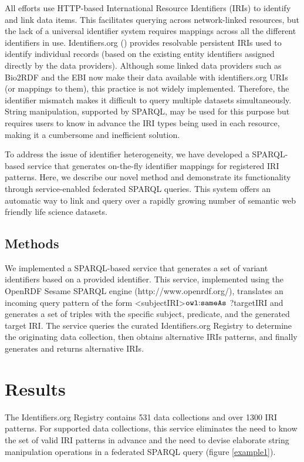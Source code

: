 \documentclass{bioinfo}
\begin{document}
All efforts use HTTP-based International Resource Identifiers (IRIs) to identify and link data items. This facilitates querying across network-linked resources, but the lack of a universal identifier system requires mappings across all the different identifiers in use. Identifiers.org (\cite{Juty01012012}) provides resolvable persistent IRIs used to identify individual records (based on the existing entity identifiers assigned directly by the data providers). Although some linked data providers such as Bio2RDF and the EBI now make their data available with identifiers.org URIs (or mappings to them), this practice is not widely implemented. Therefore, the identifier mismatch makes it difficult to query multiple datasets simultaneously. String manipulation, supported by SPARQL, may be used for this purpose but requires users to know in advance the IRI types being used in each resource, making it a cumbersome and inefficient solution.
 
To address the issue of identifier heterogeneity, we have developed a SPARQL-based service that generates on-the-fly identifier mappings for registered IRI patterns. Here, we describe our novel method and demonstrate its functionality through service-enabled federated SPARQL queries. This system offers an automatic way to link and query over a rapidly growing number of semantic web friendly life science datasets.

\begin{methods}
\section{Methods}
We implemented a SPARQL-based service that generates a set of variant identifiers based on a provided identifier. This service, implemented using the OpenRDF Sesame SPARQL engine (http://www.openrdf.org/), translates an incoming query pattern of the form \textless subjectIRI\textgreater $\mathtt{owl\text{\rm :}{}sameAs}$ ?targetIRI and generates a set of triples with the specific subject, predicate, and the generated target IRI. The service queries the curated Identifiers.org Registry to determine the originating data collection, then obtains alternative IRIs patterns, and finally generates and returns alternative IRIs.
\end{methods}

\section{Results}
The Identifiers.org Registry contains 531 data collections and over 1300 IRI patterns. For supported data collections, this service eliminates the need to know the set of valid IRI patterns in advance and the need to devise elaborate string manipulation operations in a federated SPARQL query (figure \ref{example1}).
\end{document}

